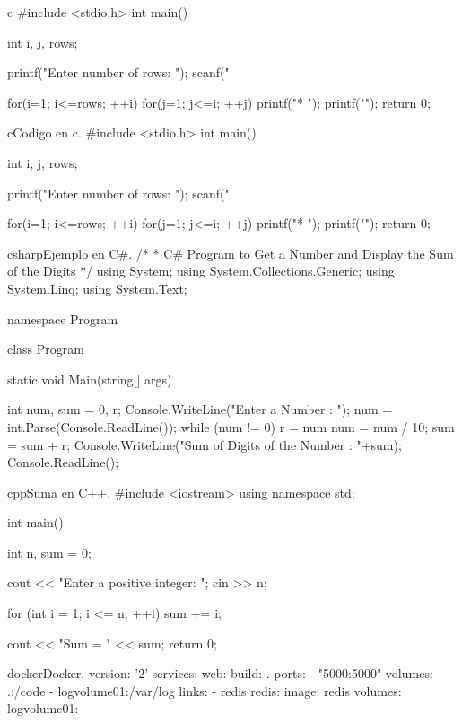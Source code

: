 \begin{sourcecode}[]{c}{}
#include <stdio.h>
int main(){
	int i, j, rows;
	
	printf("Enter number of rows: ");
	scanf("%
	
	for(i=1; i<=rows; ++i){
		for(j=1; j<=i; ++j){
			printf("* ");
		}
		printf("\n");
	}
	return 0;
}
\end{sourcecode}

\begin{sourcecode}[]{c}{Codigo en c.}
	#include <stdio.h>
	int main(){
		int i, j, rows;
		
		printf("Enter number of rows: ");
		scanf("%
		
		for(i=1; i<=rows; ++i){
			for(j=1; j<=i; ++j){
				printf("* ");
			}
			printf("\n");
		}
		return 0;
	}
\end{sourcecode}

\newpage

\begin{sourcecode}[]{csharp}{Ejemplo en C\#.}
/*
* C# Program to Get a Number and Display the Sum of the Digits 
*/
using System;
using System.Collections.Generic;
using System.Linq;
using System.Text;

namespace Program
{
	class Program
	{
		static void Main(string[] args)
		{
			int num, sum = 0, r;
			Console.WriteLine("Enter a Number : ");
			num = int.Parse(Console.ReadLine());
			while (num != 0)
			{
				r = num %
				num = num / 10;
				sum = sum + r;
			}
			Console.WriteLine("Sum of Digits of the Number : "+sum);
			Console.ReadLine();
			
		}
	}
}
\end{sourcecode}

\newpage
\begin{sourcecode}{cpp}{Suma en C++.}
#include <iostream>
using namespace std;

int main()
{
	int n, sum = 0;
	
	cout << "Enter a positive integer: ";
	cin >> n;
	
	for (int i = 1; i <= n; ++i) {
		sum += i;
	}
	
	cout << "Sum = " << sum;
	return 0;
}
\end{sourcecode}

\begin{sourcecode}{docker}{Docker.}
version: '2'
services:
web:
build: .
ports:
- "5000:5000"
volumes:
- .:/code
- logvolume01:/var/log
links:
- redis
redis:
image: redis
volumes:
logvolume01: {}
\end{sourcecode}


